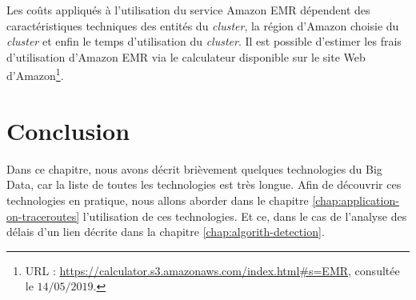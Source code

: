 Les coûts appliqués  à l'utilisation du service Amazon EMR dépendent des caractéristiques techniques des entités du \textit{cluster}, la région d'Amazon choisie du \textit{cluster} et enfin le temps d'utilisation du \textit{cluster}. Il est possible d'estimer les frais d'utilisation d'Amazon EMR via le calculateur disponible sur le site Web d'Amazon\footnote{URL : \url{https://calculator.s3.amazonaws.com/index.html\#s=EMR}, consultée le $14/05/2019$.}.


\section{Conclusion}

Dans ce chapitre,  nous avons décrit brièvement  quelques technologies du Big Data, car la liste de toutes les technologies est très longue. Afin de découvrir ces technologies en pratique, nous allons aborder dans le chapitre \ref{chap:application-on-traceroutes} l'utilisation de ces technologies. Et ce,  dans le cas de l'analyse des délais d'un lien décrite dans la chapitre \ref{chap:algorith-detection}.    









